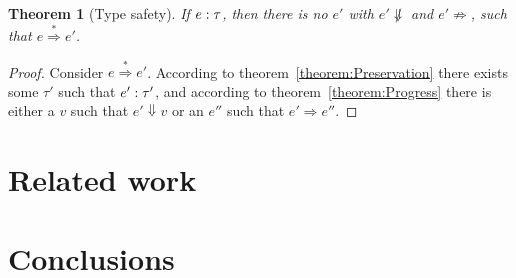 \documentclass[12pt,a2paper,draft]{article}
\newcommand{\tj}[2]{\mbox{\ensuremath{{#1}:{#2}}}}
\newtheorem{theorem}{Theorem}
\begin{document}
\begin{theorem}[Type safety]
  If $\tj{e}{\tau}$, then there is no $e'$ with
  $e' \not\Downarrow$ and $e' \not\Rightarrow$,
  such that $e \stackrel{*}{\Rightarrow} e'$.
\end{theorem}

\begin{proof}
  Consider $e \stackrel{*}{\Rightarrow} e'$. According to theorem~\ref{theorem:Preservation} there
  exists some $\tau'$ such that $\tj{e'}{\tau'}$, and according to theorem~\ref{theorem:Progress}
  there is either a $v$ such that $e' \Downarrow v$ or an $e''$ such that $e' \Rightarrow e''$.
\end{proof}


\section{Related work}


\section{Conclusions}




\end{document}
